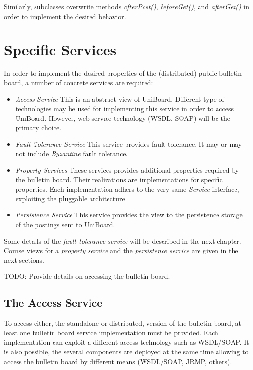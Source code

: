 \documentclass[oneside]{scrreprt}
\newcommand{\uniboard}{\mbox{UniBoard}}
\begin{document}
Similarly, subclasses overwrite methods \emph{afterPost()},
\emph{beforeGet()}, and \emph{afterGet()} in order to implement
the desired behavior.


\chapter{Specific Services}

In order to implement the desired properties of the (distributed)
public bulletin board, a number of concrete services are required:

\begin{itemize}
	\item \emph{Access Service} This is an abstract view
		of \uniboard. Different type of technologies may be used
		for implementing this service in order to access
		\uniboard. However, web service
		technology (WSDL, SOAP) will be the primary choice.
	\item \emph{Fault Tolerance Service} This service provides
		fault tolerance. It may or
		may not include \emph{Byzantine} fault tolerance.
	\item \emph{Property Services} These services
		provides additional
		properties required by the bulletin board. Their
		realizations are implementations for specific
		properties. Each implementation adhers to the very same
		\emph{Service} interface, exploiting the pluggable
		architecture.
	\item \emph{Persistence Service} This service provides
		the view to the persistence storage of the postings
		sent to \uniboard.
\end{itemize}

Some details of the \emph{fault tolerance service} will be described
in the next chapter. Course views for a \emph{property service}
and the \emph{persistence service} are given in the next sections.

TODO: Provide details on accessing the bulletin board.


\section{The Access Service}

To access either, the standalone or distributed, version
of the bulletin board, at least one bulletin board
service implementation must be provided. Each implementation
can exploit a different access technology such as WSDL/SOAP.
It is also possible, the several components are deployed at
the same time allowing to access the bulletin board by
different means (WSDL/SOAP, JRMP, others).
\end{document}

